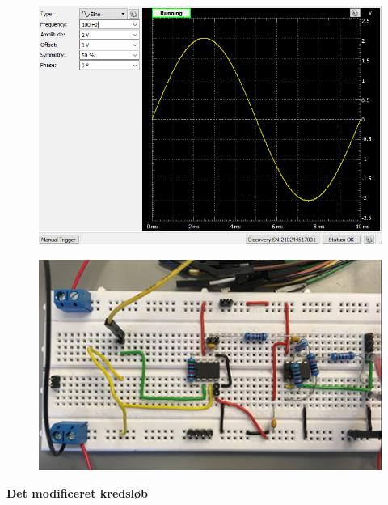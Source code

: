 \begin{figure}[H]
\centering
\begin{minipage}{.5\textwidth}
  \centering
  \includegraphics[width=.9\linewidth]{Figure/VCCSwavegen1}
  \label{fig:test1}
\end{minipage}%
\begin{minipage}{.5\textwidth}
  \centering
  \includegraphics[width=.9\linewidth]{Figure/oprindeligekredslob}
  \label{fig:test2}
\end{minipage}
\end{figure}








\textbf{Det modificeret kredsløb}\\

